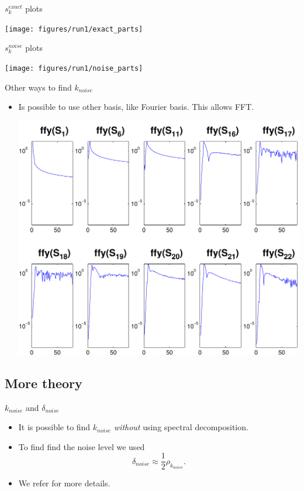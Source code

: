 \documentclass{beamer}
\begin{document}
\begin{frame}{$s_{k}^{exact}$ plots}
  \begin{center}
    \texttt{[image: figures/run1/exact\_parts]}
  \end{center}
\end{frame}

\begin{frame}{$s_{k}^{noise}$ plots}
  \begin{center}
    \texttt{[image: figures/run1/noise\_parts]}
  \end{center}
\end{frame}

\begin{frame}{Other ways to find $k_{noise}$}
  \begin{itemize}
    \item Is possible to use other basis, like Fourier basis. This allows FFT.
      \begin{center}
        \includegraphics[width=0.55\linewidth]{figures/run1/fft_sk}
      \end{center}
  \end{itemize}
\end{frame}

\subsection{More theory}
\begin{frame}{$k_{noise}$ and $\delta_{noise}$}
  \begin{itemize}
    \item It is possible to find $k_{noise}$ \emph{without} using spectral
      decomposition.
    \item To find find the noise level we used
      \begin{equation*}
	\delta_{noise} \approx \frac{1}{2}\rho_{k_{noise}}.
      \end{equation*}
    \item We refer \cite{bidiagonalization} for more details.
  \end{itemize}
\end{frame}
\end{document}
